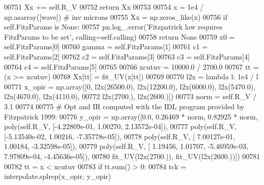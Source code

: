 \begin{DoxyCode}
{00751 \textcolor{stringliteral}{            Xx += self.R\_V}
00752 \textcolor{stringliteral}{            return Xx}
00753 \textcolor{stringliteral}{            }
00754 \textcolor{stringliteral}{        x = 1e4 / np.asarray([wave]) # inv microns}
00755 \textcolor{stringliteral}{        Xx = np.zeros\_like(x)}
00756 \textcolor{stringliteral}{        if self.FitzParams is None:}
00757 \textcolor{stringliteral}{            pn.log\_.error('Fitzpatrick law requires FitzParams to be set', calling=self.calling)}
00758 \textcolor{stringliteral}{            return None}
00759 \textcolor{stringliteral}{        x0 = self.FitzParams[0]}
00760 \textcolor{stringliteral}{        gamma = self.FitzParams[1]}
00761 \textcolor{stringliteral}{        c1 = self.FitzParams[2]}
00762 \textcolor{stringliteral}{        c2 = self.FitzParams[3]}
00763 \textcolor{stringliteral}{        c3 = self.FitzParams[4]}
00764 \textcolor{stringliteral}{        c4 = self.FitzParams[5]}
00765 \textcolor{stringliteral}{        }
00766 \textcolor{stringliteral}{        xcutuv = 10000.0 / 2700.0}
00767 \textcolor{stringliteral}{        tt = (x >= xcutuv) }
00768 \textcolor{stringliteral}{        Xx[tt] = fit\_UV(x[tt])}
00769 \textcolor{stringliteral}{        }
00770 \textcolor{stringliteral}{        l2x = lambda l: 1e4 / l}
00771 \textcolor{stringliteral}{        x\_opir = np.array([0, l2x(26500.0), l2x(12200.0), l2x(6000.0), l2x(5470.0), l2x(4670.0),
       l2x(4110.0),}
00772 \textcolor{stringliteral}{                  l2x(2700.), l2x(2600.)])}
00773 \textcolor{stringliteral}{        norm = self.R\_V / 3.1}
00774 \textcolor{stringliteral}{        }
00775 \textcolor{stringliteral}{        # Opt and IR computed with the IDL program provided by Fitzpatrick 1999:        }
00776 \textcolor{stringliteral}{        y\_opir = np.array([0.0, 0.26469 * norm, 0.82925 * norm, poly(self.R\_V, [-4.22809e-01, 1.00270,
       2.13572e-04]),}
00777 \textcolor{stringliteral}{                    poly(self.R\_V, [-5.13540e-02, 1.00216, -7.35778e-05]),}
00778 \textcolor{stringliteral}{                    poly(self.R\_V, [ 7.00127e-01, 1.00184, -3.32598e-05]),}
00779 \textcolor{stringliteral}{                    poly(self.R\_V, [ 1.19456, 1.01707, -5.46959e-03, 7.97809e-04, -4.45636e-05]),}
00780 \textcolor{stringliteral}{                    fit\_UV(l2x(2700.)), fit\_UV(l2x(2600.))])}
00781 \textcolor{stringliteral}{        }
00782 \textcolor{stringliteral}{        tt = x < xcutuv}
00783 \textcolor{stringliteral}{        if tt.sum() > 0:}
00784 \textcolor{stringliteral}{            tck = interpolate.splrep(x\_opir, y\_opir)}
}
\end{DoxyCode}
